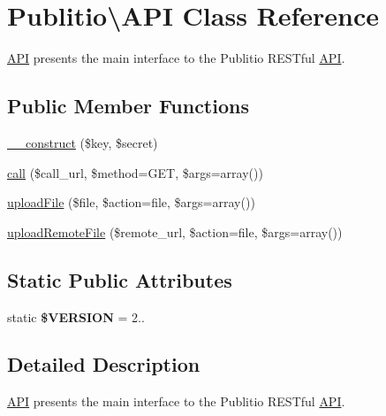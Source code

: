 \hypertarget{classPublitio_1_1API}{}\section{Publitio\textbackslash{}A\+PI Class Reference}
\label{classPublitio_1_1API}


\hyperlink{classPublitio_1_1API}{A\+PI} presents the main interface to the Publitio R\+E\+S\+Tful \hyperlink{classPublitio_1_1API}{A\+PI}.  


\subsection*{Public Member Functions}
\begin{DoxyCompactItemize}
\item 
\hyperlink{classPublitio_1_1API_af80d6037cdea9ea685abb5db6ed68b3c}{\+\_\+\+\_\+construct} (\$key, \$secret)
\item 
\hyperlink{classPublitio_1_1API_ae58db8a70b7f72d7b16aa1dea4f9a292}{call} (\$call\+\_\+url, \$method=\textquotesingle{}G\+ET\textquotesingle{}, \$args=array())
\item 
\hyperlink{classPublitio_1_1API_a05a6ab443cb16c2ef3be2a3f2c434d7b}{upload\+File} (\$file, \$action=\textquotesingle{}file\textquotesingle{}, \$args=array())
\item 
\hyperlink{classPublitio_1_1API_ab5b9b82b9b26449fcbbc023cab0c389a}{upload\+Remote\+File} (\$remote\+\_\+url, \$action=\textquotesingle{}file\textquotesingle{}, \$args=array())
\end{DoxyCompactItemize}
\subsection*{Static Public Attributes}
\begin{DoxyCompactItemize}
\item 
\mbox{\label{classPublitio_1_1API_aab29941f3090b73c32c40a07adfb204a}} 
static {\bfseries \$\+V\+E\+R\+S\+I\+ON} = \textquotesingle{}2..\textquotesingle{}
\end{DoxyCompactItemize}


\subsection{Detailed Description}
\hyperlink{classPublitio_1_1API}{A\+PI} presents the main interface to the Publitio R\+E\+S\+Tful \hyperlink{classPublitio_1_1API}{A\+PI}. 

